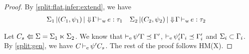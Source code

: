 \begin{proof}
  By \cref{split:flat,infer:extend}, we have
  \begin{align*}
    \inferW{\Sv_1}{(C_1,\unif_1)}{\Eflat\E&}{e}{\tau_1}
    &\inferW{\Sv_2}{(C_2,\unif_2)}{\Eflat\E&}{e}{\tau_2}
  \end{align*}

  Let $\bsplit{C_s}{\Sv}{\Sv_1}{\Sv_2}$.
  We know that $\entail{}{\unif'\E \preceq \E'}$,
  $\entail{}{\unif'_i\E_i \preceq \E'_i}$ and $\Sv_i\subset\E_i$.
  By \cref{split:gen},
  we have $\entail{C}{\unif' C_s}$.
  The rest of the proof follows HM(X).

\end{proof}



